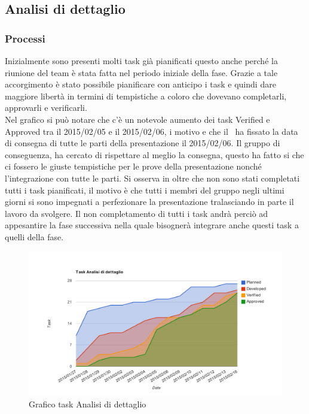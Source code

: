 		\subsection{Analisi di dettaglio}
		\subsubsection{Processi}
		Inizialmente sono presenti molti task già pianificati questo anche perché la  riunione del team è stata fatta nel periodo iniziale della fase. Grazie a tale accorgimento è stato possibile pianificare con anticipo i task e quindi dare maggiore libertà in termini di tempistiche a coloro che dovevano completarli,  approvarli e verificarli.  \\
		Nel grafico si può notare che c'è un notevole aumento dei task Verified e Approved tra il 2015/02/05 e il 2015/02/06, i motivo e che il \roleProjectManager \ ha fissato la data di consegna di tutte le parti della presentazione il 2015/02/06. Il gruppo di conseguenza, ha cercato di rispettare al meglio la consegna, questo ha fatto si che ci fossero le giuste tempistiche per le prove della presentazione nonché l'integrazione con tutte le parti. Si osserva in oltre che non sono stati completati tutti i task pianificati, il motivo è che tutti i membri del gruppo negli ultimi giorni si sono impegnati a perfezionare la presentazione tralasciando in parte il lavoro da svolgere. Il non completamento di tutti i task andrà perciò ad appesantire la fase successiva nella quale bisognerà integrare anche questi task a quelli della fase.
		\begin{figure}[htbp]
				\centering
				\centerline{\includegraphics[scale=1]{images/Grafico_fase_3.pdf}}
				\caption{Grafico task Analisi di dettaglio}
				\label{fig:taskfase3}
			\end{figure}		
